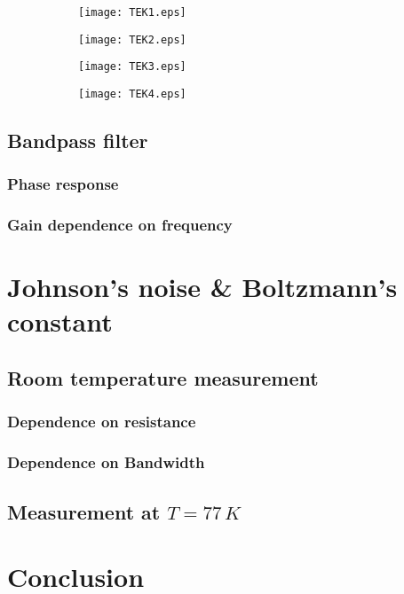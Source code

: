 \begin{figure}[H]
	\centering
	\begin{subfigure}{0.49\textwidth}
		\centering
		\texttt{[image: TEK1.eps]}
	\end{subfigure}
	\begin{subfigure}{0.49\textwidth}
		\centering
		\texttt{[image: TEK2.eps]}
	\end{subfigure}
	
	\begin{subfigure}{0.49\textwidth}
		\centering
		\texttt{[image: TEK3.eps]}
	\end{subfigure}
	\begin{subfigure}{0.49\textwidth}
		\centering
		\texttt{[image: TEK4.eps]}
	\end{subfigure}
	
	\caption{}
	\label{fig:xy}
\end{figure}


\subsection{Bandpass filter}
\subsubsection{Phase response}

\subsubsection{Gain dependence on frequency}








\section{Johnson's noise \& Boltzmann's constant}

\subsection{Room temperature measurement}

\subsubsection{Dependence on resistance}

\subsubsection{Dependence on Bandwidth}




\subsection{Measurement at $T=77 \, K$}








\section{Conclusion}




